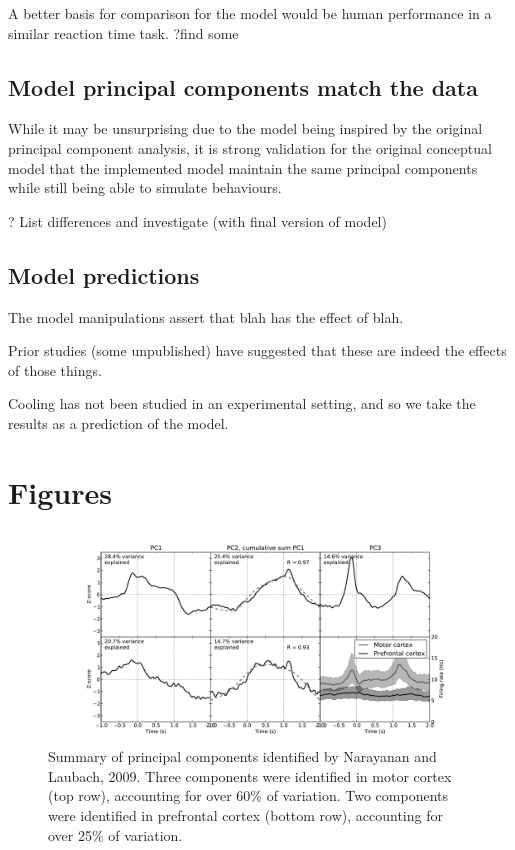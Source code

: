 \documentclass[12pt]{article}
\begin{document}
A better basis for comparison for the model
would be human performance in a similar
reaction time task. ?find some %

\subsection{Model principal components match the data}

While it may be unsurprising
due to the model being inspired by the original
principal component analysis,
it is strong validation for the original conceptual model
that the implemented model maintain
the same principal components
while still being able to simulate behaviours.

? List differences and investigate (with final version of model)

\subsection{Model predictions}

The model manipulations assert that blah has the effect of blah.

Prior studies (some unpublished) have suggested that these are indeed the effects of those things.

Cooling has not been studied in an experimental setting,
and so we take the results as a prediction of the model.

\clearpage

\appendix

\section{Figures}

\begin{figure}
  \centering
    \includegraphics[width=\columnwidth]{f1-pcasummary}
    \caption{Summary of principal components identified
      by Narayanan and Laubach, 2009. Three components
      were identified in motor cortex (top row), accounting
      for over 60\% of variation.
      Two components were identified in prefrontal cortex
      (bottom row), accounting for over 25\% of variation.}
\end{figure}
\end{document}
